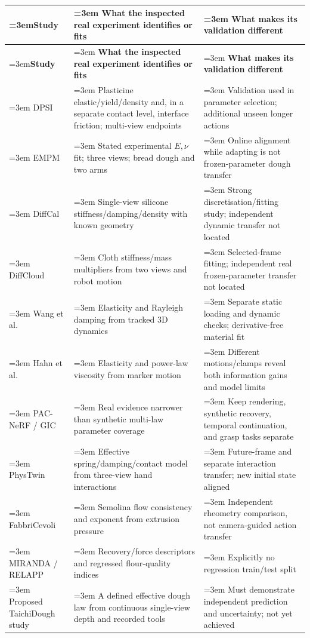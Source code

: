 \documentclass[
  11pt,
]{article}
\begin{document}
\begin{small}
\begin{longtable}{@{}>{\raggedright\sloppy\emergencystretch=3em\arraybackslash}p{} >{\raggedright\sloppy\emergencystretch=3em\arraybackslash}p{} >{\raggedright\sloppy\emergencystretch=3em\arraybackslash}p{}@{}}
\caption{}\\
\toprule
\textbf{Study} & \textbf{What the inspected real experiment identifies or fits} & \textbf{What makes its validation different} \\
\midrule
\endfirsthead
\toprule
\textbf{Study} & \textbf{What the inspected real experiment identifies or fits} & \textbf{What makes its validation different} \\
\midrule
\endhead
DPSI & Plasticine elastic/yield/density and, in a separate contact level,
interface friction; multi-view endpoints & Validation used in parameter selection; additional unseen longer actions \\
\hline
EMPM & Stated experimental \(E,\nu\) fit; three views; bread dough and two arms & Online alignment while adapting is not frozen-parameter dough transfer \\
\hline
DiffCal & Single-view silicone stiffness/damping/density with known geometry & Strong discretisation/fitting study; independent dynamic transfer not
located \\
\hline
DiffCloud & Cloth stiffness/mass multipliers from two views and robot motion & Selected-frame fitting; independent real frozen-parameter transfer not
located \\
\hline
Wang et al. & Elasticity and Rayleigh damping from tracked 3D dynamics & Separate static loading and dynamic checks; derivative-free material fit \\
\hline
Hahn et al. & Elasticity and power-law viscosity from marker motion & Different motions/clamps reveal both information gains and model limits \\
\hline
PAC-NeRF / GIC & Real evidence narrower than synthetic multi-law parameter coverage & Keep rendering, synthetic recovery, temporal continuation, and grasp
tasks separate \\
\hline
PhysTwin & Effective spring/damping/contact model from three-view hand interactions & Future-frame and separate interaction transfer; new initial state
aligned \\
\hline
Fabbri\textendash{}\allowbreak{}Cevoli & Semolina flow consistency and exponent from extrusion pressure & Independent rheometry comparison, not camera-guided action transfer \\
\hline
MIRANDA / RELAPP & Recovery/force descriptors and regressed flour-quality indices & Explicitly no regression train/test split \\
\hline
Proposed TaichiDough study & A defined effective dough law from continuous single-view depth and
recorded tools & Must demonstrate independent prediction and uncertainty; not yet
achieved \\
\bottomrule
\end{longtable}
\end{small}
\end{document}
